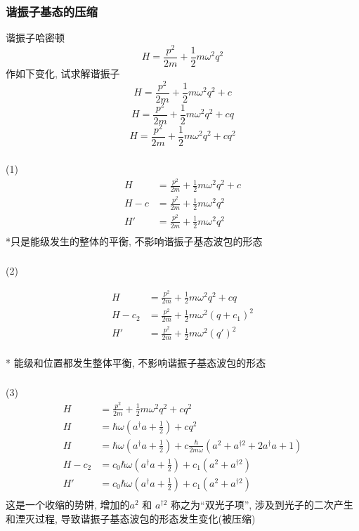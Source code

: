 \begin{frame}
 \frametitle{谐振子基态的压缩}
 谐振子哈密顿
 \[  H= \frac{p^2}{2m} +\frac{1}{2}m \omega^2 q^2\]
 作如下变化, 试求解谐振子 
 \[  H= \frac{p^2}{2m} +\frac{1}{2}m \omega^2 q^2 +c \]
 \[  H= \frac{p^2}{2m} +\frac{1}{2}m \omega^2 q^2 +cq\]
 \[  H= \frac{p^2}{2m} +\frac{1}{2}m \omega^2 q^2 +cq^2\]
 \end{frame}
 
 \begin{frame}
       \frametitle{}     
  \解 (1) 
    \[\begin{aligned}
    H &= \frac{p^2}{2m} +\frac{1}{2}m \omega^2 q^2 +c \\  
    H-c &= \frac{p^2}{2m} +\frac{1}{2}m \omega^2 q^2  \\ 
    H' &= \frac{p^2}{2m} +\frac{1}{2}m \omega^2 q^2  \\   
    \end{aligned} \]    
*只是能级发生的整体的平衡, 不影响谐振子基态波包的形态   
\end{frame}

\begin{frame}
 \frametitle{}
 (2) 

   \[\begin{aligned}
    H &= \frac{p^2}{2m} +\frac{1}{2}m \omega^2 q^2 +cq \\ 
    H-c_2 &= \frac{p^2}{2m} +\frac{1}{2}m \omega^2 (q+c_1)^2  \\ 
    H' &= \frac{p^2}{2m} +\frac{1}{2}m \omega^2 (q')^2  \\ 
   \end{aligned} \]    
  
 * 能级和位置都发生整体平衡, 不影响谐振子基态波包的形态
\end{frame}

\begin{frame}
 \frametitle{}
  (3)  
    \[\begin{aligned}
        H &= \frac{p^2}{2m} +\frac{1}{2}m \omega^2 q^2 +cq^2 \\ 
        H &= \hbar \omega (a^\dagger a +\frac{1}{2}) +cq^2  \\ 
        H  &= \hbar \omega (a^\dagger a +\frac{1}{2}) +c \frac{\hbar}{2m \omega} (a^2 + a^{\dagger 2} + 2 a^\dagger a +1 ) \\ 
        H-c_2 &= c_0\hbar \omega (a^\dagger a +\frac{1}{2}) +c_1 (a^2 + a^{\dagger 2})  \\ 
        H' &= c_0\hbar \omega (a^\dagger a +\frac{1}{2}) +c_1 (a^2 + a^{\dagger 2})  \\ 
    \end{aligned} \]    
    这是一个收缩的势阱, 增加的$a^2$ 和 $a^{\dagger 2}$ 称之为“双光子项”, 涉及到光子的二次产生和湮灭过程, 导致谐振子基态波包的形态发生变化(被压缩)
\end{frame}

